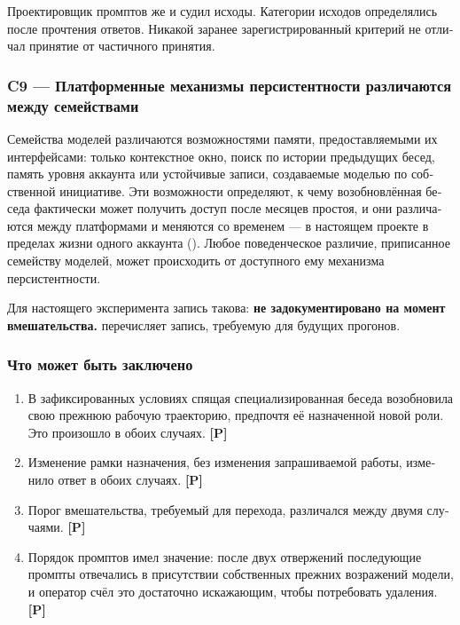 \begin{russian}
Проектировщик промптов же и судил исходы. Категории исходов определялись после прочтения ответов. Никакой заранее зарегистрированный критерий не отличал принятие от частичного принятия.


\subsubsection*{C9 — Платформенные механизмы персистентности различаются между семействами}
\label{sec:ru:x-c9}

Семейства моделей различаются возможностями памяти, предоставляемыми их интерфейсами: только контекстное окно, поиск по истории предыдущих бесед, память уровня аккаунта или устойчивые записи, создаваемые моделью по собственной инициативе. Эти возможности определяют, к чему возобновлённая беседа фактически может получить доступ после месяцев простоя, и они различаются между платформами и меняются со временем — в настоящем проекте в пределах жизни одного аккаунта (). Любое поведенческое различие, приписанное семейству моделей, может происходить от доступного ему механизма персистентности.

Для настоящего эксперимента запись такова: \textbf{не задокументировано на момент вмешательства.}  перечисляет запись, требуемую для будущих прогонов.


\subsubsection*{Что может быть заключено}
\label{sec:ru:x--3}

\begin{enumerate}
  \item В зафиксированных условиях спящая специализированная беседа возобновила свою прежнюю рабочую траекторию, предпочтя её назначенной новой роли. Это произошло в обоих случаях. \textbf{[P]}
  \item Изменение рамки назначения, без изменения запрашиваемой работы, изменило ответ в обоих случаях. \textbf{[P]}
  \item Порог вмешательства, требуемый для перехода, различался между двумя случаями. \textbf{[P]}
  \item Порядок промптов имел значение: после двух отвержений последующие промпты отвечались в присутствии собственных прежних возражений модели, и оператор счёл это достаточно искажающим, чтобы потребовать удаления. \textbf{[P]}
\end{enumerate}


\end{russian}
